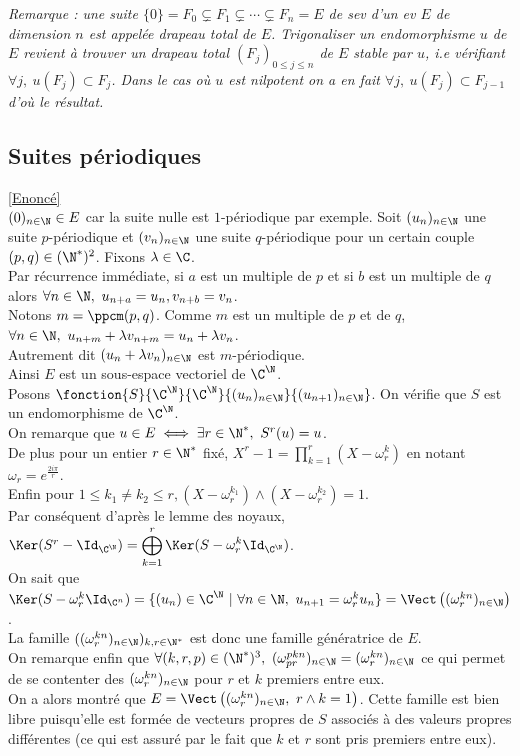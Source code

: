 \documentclass[8pt]{book}
\begin{document}
	\textit{Remarque : une suite $\{0\}=F_0\subsetneq F_1\subsetneq \cdots\subsetneq F_n=E$ de sev d'un ev $E$ de dimension $n$ est appelée drapeau total de $E$. Trigonaliser un endomorphisme $u$ de $E$ revient à trouver un drapeau total $(F_j)_{0\leq j\leq n}$ de $E$ stable par $u$, i.e vérifiant $\forall j,\ u(F_j)\subset F_j$. Dans le cas où $u$ est nilpotent on a en fait $\forall j,\ u(F_j)\subset F_{j-1}$ d'où le résultat.}
	
	\subsection{Suites périodiques }
	\label{Suites périodiques corrigé}
	\textcolor{blue}{\hyperref[Suites périodiques]{[Enoncé]}}\\
	$(0)_{n\in \N}\in E$ car la suite nulle est $1$-périodique par exemple. Soit $(u_n)_{n\in \N}$ une suite $p$-périodique et $(v_n)_{n\in \N}$ une suite $q$-périodique pour un certain couple $(p,q)\in (\N^*)^2$. Fixons $\lambda\in \C$.\\
	Par récurrence immédiate, si $a$ est un multiple de $p$ et si $b$ est un multiple de $q$ alors $\forall n\in \N,\ u_{n+a}=u_n,v_{n+b}=v_n$.\\
	Notons $m=\ppcm(p,q)$. Comme $m$ est un multiple de $p$ et de $q$, $\forall n\in \N,\ u_{n+m}+\lambda v_{n+m}=u_n+\lambda v_n$.\\
	Autrement dit $(u_n+\lambda v_n)_{n\in \N}$ est $m$-périodique.\\
	Ainsi $E$ est un sous-espace vectoriel de $\C^\N$.\\
	Posons $\fonction{S}{\C^\N}{\C^\N}{(u_n)_{n\in \N}}{(u_{n+1})_{n\in \N}}$. On vérifie que $S$ est un endomorphisme de $\C^\N$.\\
	On remarque que $u\in E\iff \exists r\in \N^*,\ S^r(u)=u$.\\
	De plus pour un entier $r\in \N^*$ fixé, $X^r-1=\displaystyle\prod_{k=1}^r(X-\omega_r^k)$ en notant $\omega_r=e^{\frac{2i\pi}{r}}$.\\
	Enfin pour $1\leq k_1\ne k_2\leq r, (X-\omega_r^{k_1})\wedge (X-\omega_r^{k_2})=1$.\\
	Par conséquent d'après le lemme des noyaux, $\Ker(S^r-\Id_{\C^\N})=\displaystyle\bigoplus_{k=1}^r\Ker(S-\omega_r^k\Id_{\C^\N})$.\\
	On sait que $\Ker(S-\omega_r^k\Id_{\C^n})=\{(u_n)\in \C^\N\ |\ \forall n\in \N,\ u_{n+1}=\omega_r^ku_n\}=\Vect\left((\omega_r^{kn})_{n\in \N}\right)$.\\
	La famille $((\omega_r^{kn})_{n\in \N})_{k,r\in \N^*}$ est donc une famille génératrice de $E$.\\
	On remarque enfin que $\forall (k,r,p)\in (\N^*)^3,\ (\omega_{pr}^{pkn})_{n\in \N}=(\omega_r^{kn})_{n\in \N}$ ce qui permet de se contenter des $(\omega_r^{kn})_{n\in \N}$ pour $r$ et $k$ premiers entre eux.\\
	On a alors montré que $E=\Vect\left((\omega_r^{kn})_{n\in \N},\ r\wedge k=1\right)$. Cette famille est bien libre puisqu'elle est formée de vecteurs propres de $S$ associés à des valeurs propres différentes (ce qui est assuré par le fait que $k$ et $r$ sont pris premiers entre eux).
	
\end{document}
